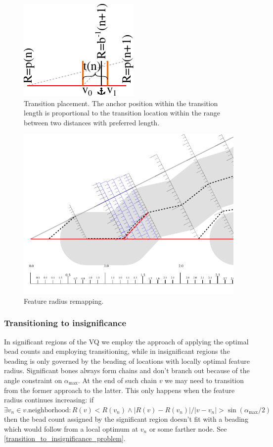 \begin{figure}
\centering
\includegraphics[width=.3\columnwidth]{sources/method/transition_location_precise.pdf}
\caption{
Transition placement.
The anchor position within the transition length is proportional to the transition location within the range between two distances with preferred length. 
}
\label{transition_placement}
\end{figure}


\begin{figure}
\centering
\includegraphics[width=.9\columnwidth]{sources/method/distance_rounding_transition.pdf}
\caption{Feature radius remapping.}
\label{distance_rounding_transition}
\end{figure}


\subsubsection{Transitioning to insignificance}
In significant regions of the VQ we employ the approach of applying the optimal bead counts and employing transitioning, while in insignificant regions the beading is only governed by the beading of locations with locally optimal feature radius.
Significant bones always form chains and don't branch out because of the angle constraint on $\alpha_\text{max}$.
At the end of such chain $v$ we may need to transition from the former approach to the latter.
This only happens when the feature radius continues increasing: if $\exists v_n \in v.\text{neighborhood}: R(v) < R(v_n) \land | R(v) - R(v_n) | / |v - v_n| >  \sin(\alpha_\text{max} / 2)$ then the bead count assigned by the significant region doesn't fit with a beading which would follow from a local optimum at $v_n$ or some farther node.
See \cref{transition_to_insignificance_problem}.


